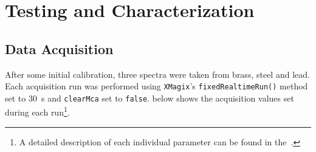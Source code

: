 \chapter{Testing and Characterization}\label{chap:testing}
    \section{Data Acquisition}\label{sec:Data Acquisition}
        After some initial calibration,  three spectra were taken from brass, steel and lead.
        Each acquisition run was performed using \texttt{XMagix}'s \texttt{fixedRealtimeRun()} method set to \qty{30}{\second} and \texttt{clearMca} set to \texttt{false}.
         below shows the acquisition values set during each run\footnote{A detailed description of each individual parameter can be found in the~\cite{Software.HandelRelease.2023,Manual.HandelAPIManual.Xiang,Manual.HandelProgrammersGuideMicroDXP.Xiang}.}.


